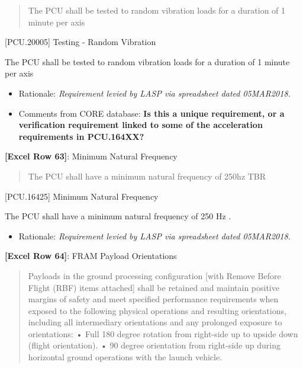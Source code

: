 \begin{quote}
The PCU shall be tested to random vibration loads for a duration of 1 minute per axis
\end{quote}

[PCU.20005] Testing - Random Vibration

The PCU shall be tested to random vibration loads for a duration of 1 minute per axis

\begin{itemize}
\item{} Rationale: \emph{Requirement levied by LASP via spreadsheet dated 05MAR2018.}

\item{} Comments from CORE database: \textbf{\textbf{Is this a unique requirement, or a verification requirement linked to some of the acceleration requirements in PCU.164XX?}}

\end{itemize}

\textbf{[Excel Row 63]}: Minimum Natural Frequency

\begin{quote}
The PCU shall have a minimum natural frequency of 250hz TBR
\end{quote}

[PCU.16425] Minimum Natural Frequency

The PCU shall have a minimum natural frequency of 250 Hz .

\begin{itemize}
\item{} Rationale: \emph{Requirement levied by LASP via spreadsheet dated 05MAR2018.}

\end{itemize}

\textbf{[Excel Row 64]}: FRAM Payload Orientations

\begin{quote}
Payloads in the ground processing configuration [with Remove Before Flight (RBF) items attached] shall be retained and maintain positive margins of safety and meet specified performance requirements when exposed to the following physical operations and resulting orientations, including all intermediary orientations and any prolonged exposure to orientations: • Full 180 degree rotation from right-side up to upside down (flight orientation).
• 90 degree orientation from right-side up during horizontal ground operations with the launch vehicle.
\end{quote}

